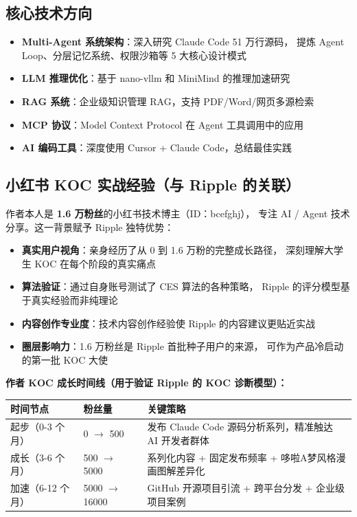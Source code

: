 \documentclass[12pt,a4paper]{ctexart}
\begin{document}
\subsection{核心技术方向}

\begin{itemize}
  \item \textbf{Multi-Agent 系统架构}：深入研究 Claude Code 51 万行源码，
        提炼 Agent Loop、分层记忆系统、权限沙箱等 5 大核心设计模式
  \item \textbf{LLM 推理优化}：基于 nano-vllm 和 MiniMind 的推理加速研究
  \item \textbf{RAG 系统}：企业级知识管理 RAG，支持 PDF/Word/网页多源检索
  \item \textbf{MCP 协议}：Model Context Protocol 在 Agent 工具调用中的应用
  \item \textbf{AI 编码工具}：深度使用 Cursor + Claude Code，总结最佳实践
\end{itemize}

\subsection{小红书 KOC 实战经验（与 Ripple 的关联）}

作者本人是 \textbf{1.6 万粉丝}的小红书技术博主（ID：bcefghj），
专注 AI / Agent 技术分享。这一背景赋予 Ripple 独特优势：

\begin{itemize}
  \item \textbf{真实用户视角}：亲身经历了从 0 到 1.6 万粉的完整成长路径，
        深刻理解大学生 KOC 在每个阶段的真实痛点
  \item \textbf{算法验证}：通过自身账号测试了 CES 算法的各种策略，
        Ripple 的评分模型基于真实经验而非纯理论
  \item \textbf{内容创作专业度}：技术内容创作经验使 Ripple 的内容建议更贴近实战
  \item \textbf{圈层影响力}：1.6 万粉丝是 Ripple 首批种子用户的来源，
        可作为产品冷启动的第一批 KOC 大使
\end{itemize}

\textbf{作者 KOC 成长时间线（用于验证 Ripple 的 KOC 诊断模型）：}

\begin{center}
\begin{tabular}{p{2.5cm} p{3.5cm} p{7cm}}
\toprule
\textbf{时间节点} & \textbf{粉丝量} & \textbf{关键策略} \\
\midrule
起步（0-3 个月） & 0 $\rightarrow$ 500 & 发布 Claude Code 源码分析系列，精准触达 AI 开发者群体 \\[3pt]
成长（3-6 个月） & 500 $\rightarrow$ 5000 & 系列化内容 + 固定发布频率 + 哆啦A梦风格漫画图解差异化 \\[3pt]
加速（6-12 个月） & 5000 $\rightarrow$ 16000 & GitHub 开源项目引流 + 跨平台分发 + 企业级项目案例 \\
\bottomrule
\end{tabular}
\end{center}
\end{document}
